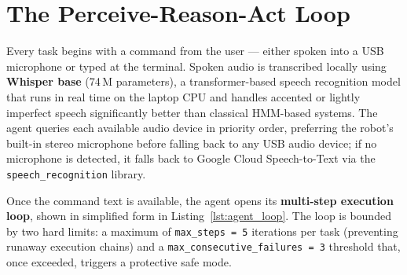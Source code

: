 \section{The Perceive-Reason-Act Loop}
\label{sec:loop}

Every task begins with a command from the user --- either spoken into a USB
microphone or typed at the terminal.
Spoken audio is transcribed locally using \textbf{Whisper base} (74\,M
parameters), a transformer-based speech recognition model that runs in real
time on the laptop CPU and handles accented or lightly imperfect speech
significantly better than classical HMM-based systems.
The agent queries each available audio device in priority order, preferring
the robot's built-in stereo microphone before falling back to any USB audio
device; if no microphone is detected, it falls back to Google Cloud
Speech-to-Text via the \texttt{speech\_recognition} library.

Once the command text is available, the agent opens its \textbf{multi-step
execution loop}, shown in simplified form in Listing~\ref{lst:agent_loop}.
The loop is bounded by two hard limits: a maximum of \texttt{max\_steps = 5}
iterations per task (preventing runaway execution chains) and a
\texttt{max\_consecutive\_failures = 3} threshold that, once exceeded, triggers
a protective safe mode.

